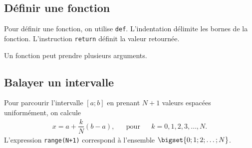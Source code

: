 

\usepackage{minted}

\SetDate[17/10/2025]


\pagestyle{fancy}
\fancyhead[R]{\today}

\subsection*{Définir une fonction}

\begin{multicols}{3}
	Pour définir une fonction, on utilise \texttt{def}.
	L'indentation délimite les bornes de la fonction.
	L'instruction \texttt{return} définit la valeur retournée.
	
	Un fonction peut prendre plusieurs arguments.
	
	\columnbreak
	\centering
	\begin{minipage}{.1\textwidth}
	\end{minipage}	
	
	\columnbreak
	\centering
	\begin{minipage}{.1\textwidth}
	\end{minipage}
\end{multicols}


\subsection*{Balayer un intervalle}

\begin{multicols}{2}
	Pour parcourir l'intervalle $[a ; b]$ en prenant $N+1$ valeurs espacées uniformément,
	on calcule
		\begin{align*} 
			x = a + \dfrac{k}N (b-a), && \text{pour} && k = 0, 1, 2, 3, \dots, N.
		\end{align*}
	L'expression \texttt{range(N+1)} correspond à l'ensemble ${\bigset{ 0 ; 1 ; 2 ; \dots ; N }}$.

	\columnbreak
	\centering
	\begin{minipage}{.2\textwidth}
	\end{minipage}
\end{multicols}


